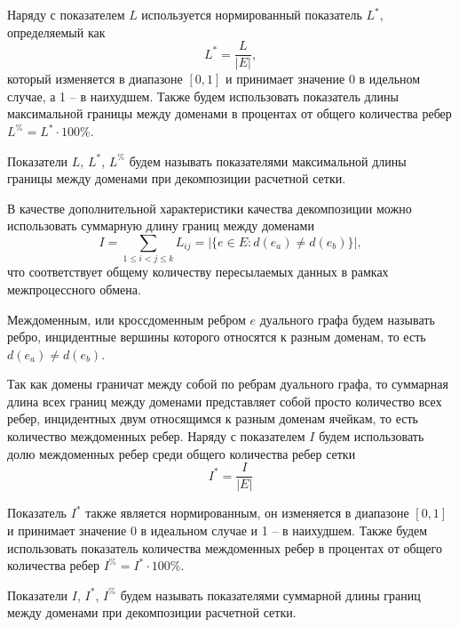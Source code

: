 Наряду с показателем $L$ используется нормированный показатель $L^{*}$, определяемый как
\begin{equation}
	L^{*} = \frac{L}{|E|},
\end{equation}
который изменяется в диапазоне $[0, 1]$ и принимает значение 0 в идельном случае, а 1 -- в наихудшем.
Также будем использовать показатель длины максимальной границы между доменами в процентах от общего количества ребер $L^{\%} = L^{*} \cdot 100\%$.

\begin{definition}
Показатели $L$, $L^{*}$, $L^{\%}$ будем называть показателями максимальной длины границы между доменами при декомпозиции расчетной сетки.
\end{definition}

В качестве дополнительной характеристики качества декомпозиции можно использовать суммарную длину границ между доменами
\begin{equation}
	I = \sum_{1 \le i < j \le k}{L_{ij}} = |\{ e \in E : d(e_a) \ne d(e_b) \}|,
\end{equation}
что соответствует общему количеству пересылаемых данных в рамках межпроцессного обмена.

\begin{definition}
Междоменным, или кроссдоменным ребром $e$ дуального графа будем называть ребро, инцидентные вершины которого относятся к разным доменам, то есть $d(e_a) \ne d(e_b)$.
\end{definition}

Так как домены граничат между собой по ребрам дуального графа, то суммарная длина всех границ между доменами представляет собой просто количество всех ребер, инцидентных двум относящимся к разным доменам ячейкам, то есть количество междоменных ребер.
Наряду с показателем $I$ будем использовать долю междоменных ребер среди общего количества ребер сетки
\begin{equation}
	I^{*} = \frac{I}{|E|}
\end{equation}

Показатель $I^{*}$ также является нормированным, он изменяется в диапазоне $[0, 1]$ и принимает значение 0 в идеальном случае и 1 -- в наихудшем.
Также будем использовать показатель количества междоменных ребер в процентах от общего количества ребер $I^{\%} = I^{*} \cdot 100\%$.

\begin{definition}
Показатели $I$, $I^{*}$, $I^{\%}$ будем называть показателями суммарной длины границ между доменами при декомпозиции расчетной сетки.
\end{definition}

